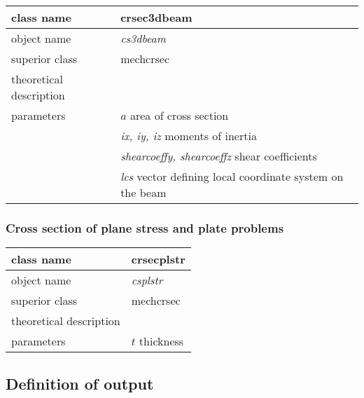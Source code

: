 \begin{center}
\begin{tabular}{|l|l|}
\hline
class name & {\sf crsec3dbeam}\index{class!{\sf crsec3dbeam}}
\\ \hline
object name & {\it cs3dbeam}\index{instance!{\it cs3dbeam}}
\\ \hline
superior class & {\sf mechcrsec}
\\ \hline
theoretical description &
\\ \hline
parameters & {\it $a$ } area of cross section
\\
 & {\it ix, iy, iz} moments of inertia
\\
 & {\it shearcoeffy, shearcoeffz} shear coefficients
\\
 & {\it lcs} vector defining local coordinate system on the beam
\\ \hline
\end{tabular}
\end{center}


\subsubsection{Cross section of plane stress and plate problems}

\begin{center}
\begin{tabular}{|l|l|}
\hline
class name & {\sf crsecplstr}\index{class!{\sf crsecplstr}}
\\ \hline
object name & {\it csplstr}\index{instance!{\it csplstr}}
\\ \hline
superior class & {\sf mechcrsec}
\\ \hline
theoretical description &
\\ \hline
parameters & {\it $t$ } thickness
\\ \hline
\end{tabular}
\end{center}





\subsection{Definition of output}

